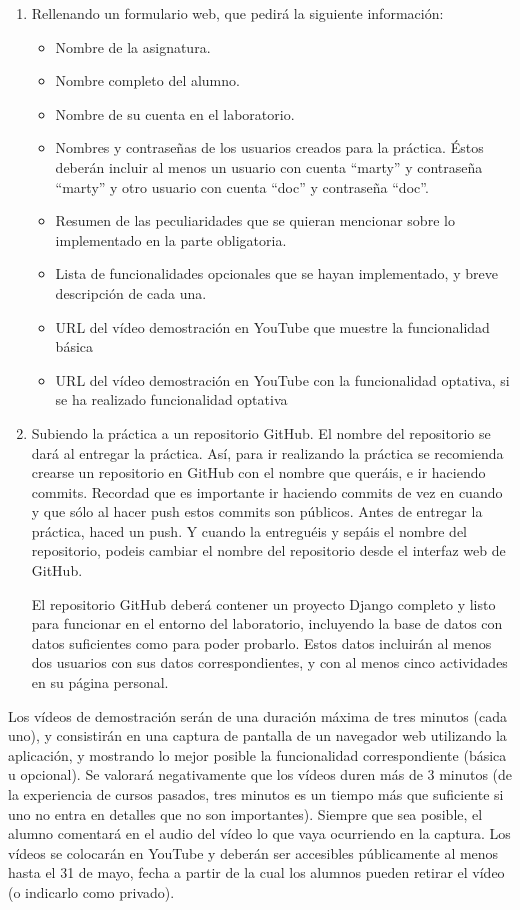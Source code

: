 \begin{enumerate}
  \item Rellenando un formulario web, que pedirá la siguiente información:
  \begin{itemize}
    \item Nombre de la asignatura.
    \item Nombre completo del alumno.
    \item Nombre de su cuenta en el laboratorio.
    \item Nombres y contraseñas de los usuarios creados para la práctica. Éstos deberán incluir al menos un usuario con cuenta ``marty'' y contraseña ``marty'' y otro usuario con cuenta ``doc'' y contraseña ``doc''.
    \item Resumen de las peculiaridades que se quieran mencionar sobre lo implementado en la parte obligatoria.
    \item Lista de funcionalidades opcionales que se hayan implementado, y breve descripción de cada una.
    \item URL del vídeo demostración en YouTube que muestre la funcionalidad básica
    \item URL del vídeo demostración en YouTube con la funcionalidad optativa, si se ha realizado funcionalidad optativa
  \end{itemize}

  \item Subiendo la práctica a un repositorio GitHub. El nombre del repositorio se dará al entregar la práctica. Así, para ir realizando la práctica se recomienda crearse un repositorio en GitHub con el nombre que queráis, e ir haciendo commits. Recordad que es importante ir haciendo commits de vez en cuando y que sólo al hacer push estos commits son públicos. Antes de entregar la práctica, haced un push. Y cuando la entreguéis y sepáis el nombre del repositorio, podeis cambiar el nombre del repositorio desde el interfaz web de GitHub. 
  
    El repositorio GitHub deberá contener un proyecto Django completo y listo para funcionar en el entorno del laboratorio, incluyendo la base de datos con datos suficientes como para poder probarlo. Estos datos incluirán al menos dos usuarios con sus datos correspondientes, y con al menos cinco actividades en su página personal.
\end{enumerate}

Los vídeos de demostración serán de una duración máxima de tres minutos (cada uno), y consistirán en una captura de pantalla de un navegador web utilizando la aplicación, y mostrando lo mejor posible la funcionalidad correspondiente (básica u opcional). Se valorará negativamente que los vídeos duren más de 3 minutos (de la experiencia de cursos pasados, tres minutos es un tiempo más que suficiente si uno no entra en detalles que no son importantes). Siempre que sea posible, el alumno comentará en el audio del vídeo lo que vaya ocurriendo en la captura. Los vídeos se colocarán en YouTube y deberán ser accesibles públicamente al menos hasta el 31 de mayo, fecha a partir de la cual los alumnos pueden retirar el vídeo (o indicarlo como privado).

